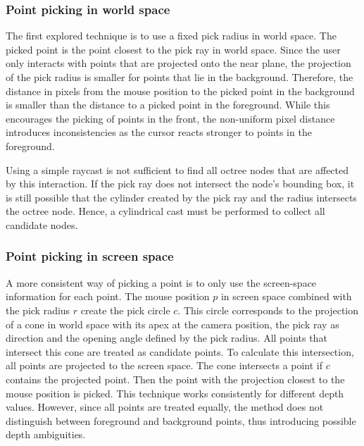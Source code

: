 \subsubsection{Point picking in world space}

The first explored technique is to use a fixed pick radius in world space. The picked point is the point closest to the pick ray in world space. Since the user only interacts with points that are projected onto the near plane, the projection of the pick radius is smaller for points that lie in the background. Therefore, the distance in pixels from the mouse position to the picked point in the background is smaller than the distance to a picked point in the foreground. While this encourages the picking of points in the front, the non-uniform pixel distance introduces inconsistencies as the cursor reacts stronger to points in the foreground. 

\par

Using a simple raycast is not sufficient to find all octree nodes that are affected by this interaction. If the pick ray does not intersect the node's bounding box, it is still possible that the cylinder created by the pick ray and the radius intersects the octree node. Hence, a cylindrical cast must be performed to collect all candidate nodes. 


\subsubsection{Point picking in screen space}

A more consistent way of picking a point is to only use the screen-space information for each point. The mouse position $p$ in screen space combined with the pick radius $r$ create the pick circle $c$. This circle corresponds to the projection of a cone in world space with its apex at the camera position, the pick ray as direction and the opening angle defined by the pick radius. All points that intersect this cone are treated as candidate points. To calculate this intersection, all points are projected to the screen space. The cone intersects a point if $c$ contains the projected point. Then the point with the projection closest to the mouse position is picked. This technique works consistently for different depth values. However, since all points are treated equally, the method does not distinguish between foreground and background points, thus introducing possible depth ambiguities. 

